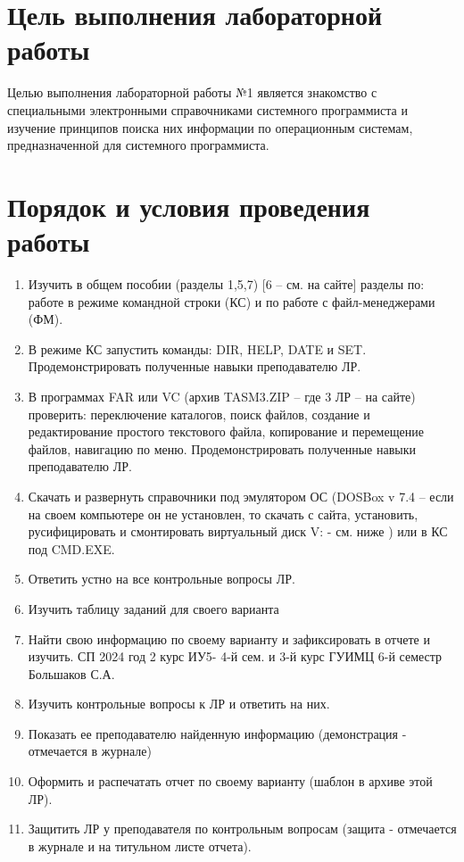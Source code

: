 \section{Цель выполнения лабораторной работы}
Целью выполнения лабораторной работы №1 является знакомство с специальными
электронными справочниками системного программиста и изучение принципов поиска
них информации по операционным системам, предназначенной для системного программиста.

\section{Порядок и условия проведения работы}
\begin{enumerate}
    \item Изучить в общем пособии (разделы 1,5,7) [6 – см. на сайте] разделы по: работе в режиме
          командной строки (КС) и по работе с файл-менеджерами (ФМ).
    \item В режиме КС запустить команды: DIR, HELP, DATE и SET. Продемонстрировать полученные
          навыки преподавателю ЛР.
    \item В программах FAR или VC (архив TASM3.ZIP – где 3 ЛР – на сайте) проверить: переключение
          каталогов, поиск файлов, создание и редактирование простого текстового файла, копирование
          и перемещение файлов, навигацию по меню. Продемонстрировать полученные навыки преподавателю ЛР.
    \item Скачать и развернуть справочники под эмулятором ОС (DOSBox v 7.4 – если на своем компьютере
          он не установлен, то скачать с сайта, установить, русифицировать и смонтировать виртуальный диск V:
          - см. ниже ) или в КС под CMD.EXE.
    \item Ответить устно на все контрольные вопросы ЛР.
    \item Изучить таблицу заданий для своего варианта
    \item Найти свою информацию по своему варианту и зафиксировать в отчете и изучить.
          СП 2024 год 2 курс ИУ5- 4-й сем. и 3-й курс ГУИМЦ 6-й семестр Большаков С.А.
    \item Изучить контрольные вопросы к ЛР и ответить на них.
    \item Показать ее преподавателю найденную информацию (демонстрация - отмечается в журнале)
    \item Оформить и распечатать отчет по своему варианту (шаблон в архиве этой ЛР).
    \item Защитить ЛР у преподавателя по контрольным вопросам (защита - отмечается в журнале
          и на титульном листе отчета).
\end{enumerate}


